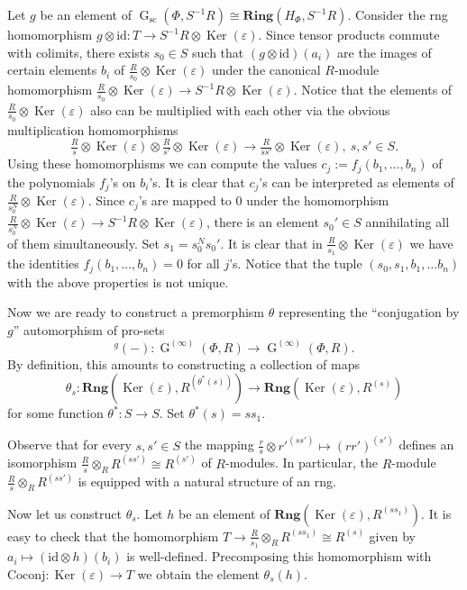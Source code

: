 \documentclass[oneside, 11pt]{amsart}
\numberwithin{equation}{section}
\theoremstyle{definition}
\theoremstyle{remark}
\DeclareMathOperator\Ker{Ker}
\DeclareMathOperator\GG{G}
\newcommand{\Rng}{\mathbf{Rng}}
\newcommand{\up}[2]{{^{#1}\!{#2}}}
\begin{document}
Let $g$ be an element of $\GG_{\mathrm{sc}}(\Phi, S^{-1} R) \cong \mathbf{Ring}(H_\Phi, S^{-1}R)$. Consider the rng homomorphism \(g \otimes \mathrm{id} \colon T \to S^{-1} R \otimes \Ker(\varepsilon)\).
Since tensor products commute with colimits, there exists \(s_0 \in S\) such that \((g \otimes \mathrm{id})(a_i)\) are the images of certain elements $b_i$ of $\frac R{s_0} \otimes \Ker(\varepsilon)$ under the canonical $R$-module homomorphism $ \tfrac R{s_0} \otimes \Ker(\varepsilon) \to S^{-1}R \otimes \Ker(\varepsilon).$
Notice that the elements of $\tfrac R {s_0} \otimes \Ker(\varepsilon)$ also can be multiplied with each other via the obvious multiplication homomorphisms
\[ \tfrac R {s} \otimes \Ker(\varepsilon) \otimes \tfrac R {s'} \otimes \Ker(\varepsilon) \to \tfrac R {ss'} \otimes \Ker(\varepsilon),\ s,s'\in S. \]
Using these homomorphisms we can compute the values $c_j := f_j(b_1,\ldots, b_n)$ of the polynomials $f_j$'s on $b_i$'s.
It is clear that $c_j$'s can be interpreted as elements of $\frac R {s_0^N}\otimes \Ker(\varepsilon)$. Since $c_j$'s are mapped to $0$ under the homomorphism $\frac R {s_0^N} \otimes \Ker(\varepsilon) \to S^{-1}R \otimes \Ker(\varepsilon)$, there is an element $s_0' \in S$ annihilating all of them simultaneously. Set $s_1 = s_0^N s_0'$. It is clear that in $\frac R{s_1} \otimes \Ker(\varepsilon)$ we have the identities \(f_j(b_1, \ldots, b_n) = 0\) for all \(j\)'s.
Notice that the tuple $(s_0, s_1, b_1,\ldots b_n)$ with the above properties is not unique.

Now we are ready to construct a premorphism $\theta$ representing the ``conjugation by $g$'' automorphism of pro-sets
\[\up g{(-)} \colon \GG^{(\infty)}(\Phi, R) \to \GG^{(\infty)}(\Phi, R).\]
By definition, this amounts to constructing a collection of maps
\[\theta_{s}\colon \Rng(\Ker(\varepsilon), R^{(\theta^*(s))}) \to \Rng(\Ker(\varepsilon), R^{(s)})\]
for some function $\theta^* \colon S \to S$. Set $\theta^*(s) = ss_1$.

Observe that for every \(s, s' \in S\) the mapping $ \frac rs \otimes {r'}^{(ss')} \mapsto (rr')^{(s')}$ defines an isomorphism \(\frac Rs \otimes_R R^{(ss')} \cong R^{(s')}\) of $R$-modules. In particular, the \(R\)-module \(\frac Rs \otimes_R R^{(ss')}\) is equipped with a natural structure of an rng.

Now let us construct $\theta_s$. Let $h$ be an element of $\Rng(\Ker(\varepsilon), R^{(ss_1)})$.
It is easy to check that the homomorphism $ T \to \frac R{s_1} \otimes_R R^{(s s_1)} \cong R^{(s)}$ given by $a_i \mapsto (\mathrm{id} \otimes h)(b_i)$
is well-defined. Precomposing this homomorphism with \(\mathrm{Coconj}\colon \Ker(\varepsilon) \to T\) we obtain the element $\theta_s(h)$.
\end{document}
